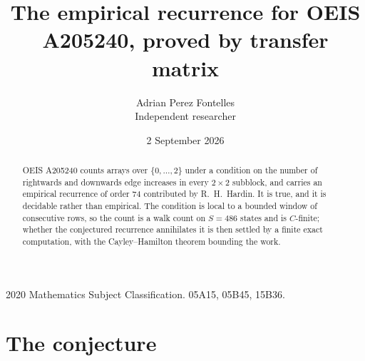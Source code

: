 \documentclass[11pt,a4paper]{article}
\title{The empirical recurrence for OEIS A205240, proved by transfer matrix}
\author{Adrian Perez Fontelles\\ \small Independent researcher}
\date{2 September 2026}
\theoremstyle{plain}
\theoremstyle{definition}
\begin{document}
\maketitle

\begin{abstract}
OEIS A205240 counts arrays over $\{0,\dots,2\}$ under a condition on the number of rightwards and downwards edge increases
in every $2\times2$ subblock, and carries an empirical recurrence of order $74$ contributed by
R.~H.~Hardin. It is true, and it is decidable rather than empirical. The condition is local to
a bounded window of consecutive rows, so the count is a walk count on $S=486$ states and is
$C$-finite; whether the conjectured recurrence annihilates it is then settled by a finite exact
computation, with the Cayley--Hamilton theorem bounding the work.
\end{abstract}

\noindent\small 2020 Mathematics Subject Classification. 05A15, 05B45, 15B36.\normalsize

\section{The conjecture}
\end{document}
